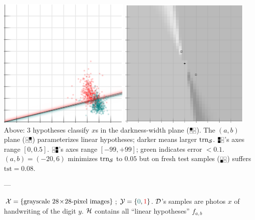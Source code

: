 \documentclass[11pt, justified]{tufte-book}
\newcommand{\offour}[1]{
    {\tiny \raisebox{0.04cm}{\scalebox{0.9}{$\substack{
        \IfSubStr{#1}{0}{{\blacksquare}}{\square}   
        \IfSubStr{#1}{1}{{\blacksquare}}{\square} \\ 
        \IfSubStr{#1}{2}{{\blacksquare}}{\square}   
        \IfSubStr{#1}{3}{{\blacksquare}}{\square}   
    }$}}}%
}
\newcommand{\samsubsubsection}[1]{
   \vspace{0.1cm}
   \par\noindent{\hspace{-2cm}\normalsize \sc \gre #1} ---
}
\newcommand{\Ein}  {\text{trn}_{\sS}}
\newcommand{\Eout} {\text{tst}}
\theoremstyle{definition}
\begin{document}
\begin{marginfigure}
          \includegraphics[width=0.48\textwidth]{example-mnist/test.png}%
          \hspace{0.03\textwidth}%
          \includegraphics[width=0.48\textwidth]{example-mnist/test-scat.png}
          Above: $3$ hypotheses classify $x$s in the darkness-width plane
          ($\offour{0}$).  The $(a,b)$ plane ($\offour{1}$) parameterizes
          linear hypotheses; darker means larger $\Ein$.
          $\offour{02}$'s axes range $[0, 0.5]$.
          $\offour{13}$'s axes range $[-99,+99]$; green indicates error $<0.1$.
          $(a,b)=(-20,6)$
          minimizes $\Ein$ to $0.05$ but on fresh test samples ($\offour{2}$)
          suffers $\Eout=0.08$. 
      \end{marginfigure}
    \samsubsubsection{tiny example}
      $\mathcal{X} = \{\text{grayscale~}28\!\times\!28\text{-pixel images}\}$; $\yY=\{{\cya{0}},{\red{1}}\}$. %
      $\mathcal{D}$'s samples are photos $x$ of 
      handwriting of the digit $y$. %
      $\mathcal{H}$ contains all ``linear hypotheses'' $f_{a,b}$ %
\end{document}
